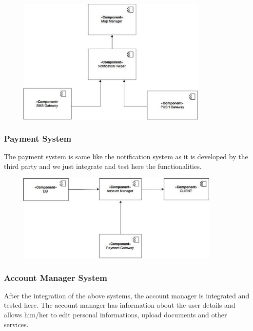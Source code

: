 \begin{figure}[h]
	\centering
	\includegraphics[height=6.285cm,keepaspectratio]{figures/components_notification.eps}
	\label{fig:components_notification}
\end{figure}

\subsubsection*{Payment System}
The payment system is same like the notification system as it is developed by the third party and we just integrate and test here the functionalities.

\newpage
\begin{figure}[h]
	\centering
	\includegraphics[height=4.38cm,keepaspectratio]{figures/components_payment.eps}
	\label{fig:components_payment}
\end{figure}

\subsubsection*{Account Manager System}
After the integration of the above systems, the account manager is integrated and tested here. The account manager has information about the user details and allows him/her to edit personal informations, upload documents and other services. 

